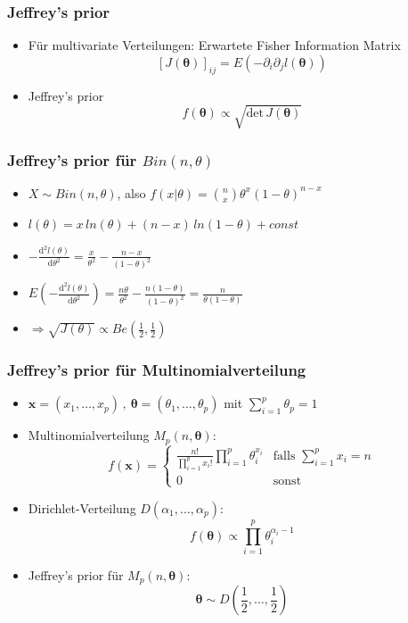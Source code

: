 \documentclass[aspectratio=169,xcolor=dvipsnames]{beamer}
\newtheorem{satz}{Satz}
\begin{document}
\begin{frame}
\frametitle{Jeffrey's prior}
\begin{itemize}
	\item<1-> Für multivariate Verteilungen: Erwartete Fisher Information Matrix $$[J(\boldsymbol{\theta})]_{ij}=E(-\partial_i\partial_jl(\boldsymbol{\theta}))$$
	\item<2-> Jeffrey's prior $$f(\boldsymbol{\theta})\propto\sqrt{\text{det}\,J(\boldsymbol{\theta})}$$
\end{itemize}
\end{frame}

\begin{frame}
\frametitle{Jeffrey's prior für $Bin(n,\theta)$}
\begin{itemize}
	\item<1-> $X\sim Bin(n,\theta)$, also $f(x|\theta)= \binom{n}{x}\theta^x(1-\theta)^{n-x}$
	\item<2-> $l(\theta)=x\,ln(\theta)+(n-x)\,ln(1-\theta)+const$
	\item<3-> $-\frac{\text{d}^2l(\theta)}{\text{d}\theta^2}=\frac{x}{\theta^2}-\frac{n-x}{(1-\theta)^2}$ 
	\item<4-> $E(-\frac{\text{d}^2l(\theta)}{\text{d}\theta^2}) = \frac{n\theta}{\theta^2}-\frac{n(1-\theta)}{(1-\theta)^2}=\frac{n}{\theta(1-\theta)}$
	\item<5-> $\Rightarrow \sqrt{J(\theta)}\propto Be(\frac{1}{2},\frac{1}{2})$
\end{itemize}
\end{frame}

\begin{frame}
\frametitle{Jeffrey's prior für Multinomialverteilung}
\begin{itemize}
	\item<1-> $\boldsymbol{x}=(x_1,\dots,x_p)\,,~\boldsymbol{\theta}=(\theta_1,\dots,\theta_p)$ mit $\sum_{i=1}^p\theta_p = 1$
	\item<2-> Multinomialverteilung $M_p(n,\boldsymbol{\theta})$: $$f(\boldsymbol{x})=\left\{\begin{array}{ll}
	\frac{n!}{\prod_{i=1}^{p}x_i!}\prod_{i=1}^{p}\theta_i^{x_i} & \text{falls }\sum_{i=1}^{p}x_i=n\\
	0 & \text{sonst}
	\end{array}\right.$$
	\item<3-> Dirichlet-Verteilung $D(\alpha_1,\dots,\alpha_p)$: $$f(\boldsymbol{\theta})\propto\prod_{i=1}^{p}\theta_i^{\alpha_i-1}$$
	\item<4-> Jeffrey's prior für $M_p(n,\boldsymbol{\theta})$:
	$$\boldsymbol{\theta}\sim D\left(\frac{1}{2},\dots,\frac{1}{2}\right)$$
\end{itemize}
\end{frame}
\end{document}
